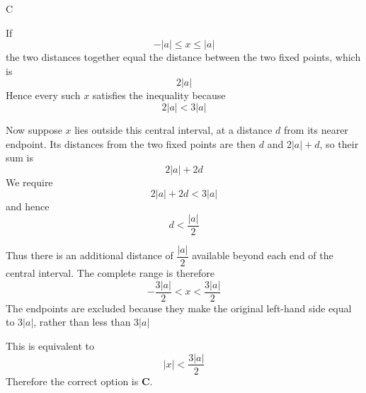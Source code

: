 \documentclass[11pt,a4paper]{article}
\begin{document}
\begin{enumerate}[label=\textbf{\arabic*.},leftmargin=*,itemsep=0pt,start=2]
\begin{djsSolution}{C}
\begin{djsSolutionFigure}
\end{djsSolutionFigure}

If
\[
-|a|\leq x\leq |a|
\]
the two distances together equal the distance between the two fixed points, which is
\[
2|a|
\]
Hence every such $x$ satisfies the inequality because
\[
2|a|<3|a|
\]

Now suppose $x$ lies outside this central interval, at a distance $d$ from its nearer endpoint. Its distances from the two fixed points are then $d$ and $2|a|+d$, so their sum is
\[
2|a|+2d
\]
We require
\[
2|a|+2d<3|a|
\]
and hence
\[
d<\frac{|a|}{2}
\]

Thus there is an additional distance of $\dfrac{|a|}{2}$ available beyond each end of the central interval. The complete range is therefore
\[
-\frac{3|a|}{2}<x<\frac{3|a|}{2}
\]
The endpoints are excluded because they make the original left-hand side equal to $3|a|$, rather than less than $3|a|$

This is equivalent to
\[
|x|<\frac{3|a|}{2}
\]
Therefore the correct option is \textbf{C}.
\end{djsSolution}
\end{enumerate}
\clearpage
\thispagestyle{djssolutions}
\vspace*{8pt}
\end{document}
